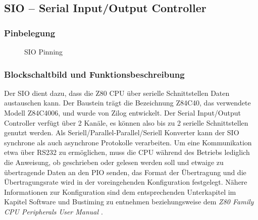 \subsection{SIO -- Serial Input/Output Controller}
\subsubsection{Pinbelegung}
\begin{figure}[htb]
    \qquad
    \qquad
    \caption[Z80 SIO Pinning]{SIO Pinning \cite{z80:sio}}
    \label{fig:z80-sio-pinning}
\end{figure}

\subsubsection{Blockschaltbild und Funktionsbeschreibung}
Der SIO dient dazu, dass die Z80 CPU über serielle Schnittstellen Daten austauschen kann. Der Baustein trägt die Bezeichnung Z84C40, das verwendete Modell Z84C4006, und wurde von Zilog entwickelt. Der Serial Input/Output Controller verfügt über 2 Kanäle, es können also bis zu 2 serielle Schnittstellen genutzt werden. Als Seriell/Parallel-Parallel/Seriell Konverter kann der SIO synchrone als auch asynchrone Protokolle verarbeiten. Um eine Kommunikation etwa über RS232 zu ermöglichen, muss die CPU während des Betriebs lediglich die Anweisung, ob geschrieben oder gelesen werden soll und etwaige zu übertragende Daten an den PIO senden, das Format der Übertragung und die Übertragungsrate wird in der voreingehenden Konfiguration festgelegt. Nähere Informationen zur Konfiguration sind dem entsprechenden Unterkapitel im Kapitel Software und Bustiming zu entnehmen beziehungsweise dem \textit{Z80 Family CPU Peripherals User Manual \cite{z80:periph}}.


